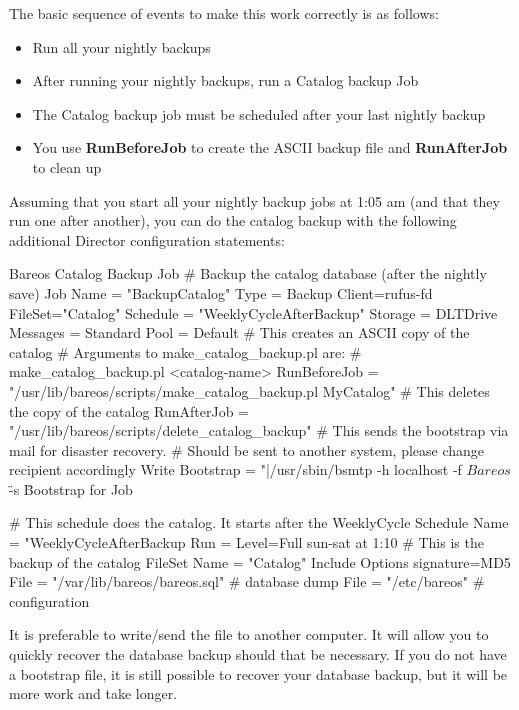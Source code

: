 The basic sequence of events to make this work correctly is as follows:

\begin{itemize}
\item Run all your nightly backups
\item After running your nightly backups, run a Catalog backup Job
\item The Catalog backup job must be scheduled after your last nightly backup

\item You use {\bf RunBeforeJob} to create the ASCII  backup file and {\bf
   RunAfterJob} to clean up
\end{itemize}

Assuming that you start all your nightly backup jobs at 1:05 am (and that they
run one after another), you can do the catalog backup with the following
additional Director configuration statements:

\begin{bconfig}{Bareos Catalog Backup Job}
# Backup the catalog database (after the nightly save)
Job {
  Name = "BackupCatalog"
  Type = Backup
  Client=rufus-fd
  FileSet="Catalog"
  Schedule = "WeeklyCycleAfterBackup"
  Storage = DLTDrive
  Messages = Standard
  Pool = Default
  # This creates an ASCII copy of the catalog
  # Arguments to make_catalog_backup.pl are:
  #  make_catalog_backup.pl <catalog-name>
  RunBeforeJob = "/usr/lib/bareos/scripts/make_catalog_backup.pl MyCatalog"
  # This deletes the copy of the catalog
  RunAfterJob  = "/usr/lib/bareos/scripts/delete_catalog_backup"
  # This sends the bootstrap via mail for disaster recovery.
  # Should be sent to another system, please change recipient accordingly
  Write Bootstrap = "|/usr/sbin/bsmtp -h localhost -f \"\(Bareos\) \" -s \"Bootstrap for Job %
}

# This schedule does the catalog. It starts after the WeeklyCycle
Schedule {
  Name = "WeeklyCycleAfterBackup
  Run = Level=Full sun-sat at 1:10
}
# This is the backup of the catalog
FileSet {
  Name = "Catalog"
  Include {
    Options {
      signature=MD5
    }
    File = "/var/lib/bareos/bareos.sql" # database dump
    File = "/etc/bareos"                # configuration
  }
}
\end{bconfig}

It is preferable
to write/send the  file to another computer. It will allow
you to quickly recover the database backup should that be necessary.  If
you do not have a bootstrap file, it is still possible to recover your
database backup, but it will be more work and take longer.



